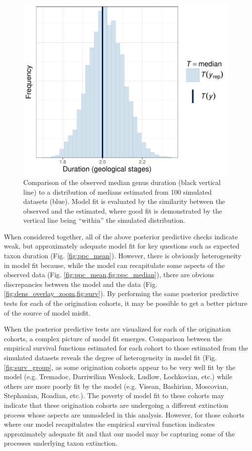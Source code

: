 \documentclass[11pt]{article}
\begin{document}
\begin{figure}[ht]
  \centering
  \includegraphics[height = 0.5\textheight,width=\textwidth,keepaspectratio=true]{figure/ppc_median_cweib_cens}
  \caption{ Comparison of the observed median genus duration (black vertical line) to a distribution of medians estimated from 100 simulated datasets (blue). Model fit is evaluated by the similarity between the observed and the estimated, where good fit is demonstrated by the vertical line being ``within'' the simulated distribution. }
  \label{fig:ppc_median}
\end{figure}


When considered together, all of the above posterior predictive checks indicate weak, but approximately adequate model fit for key questions such as expected taxon duration (Fig. \ref{fig:ppc_mean}). However, there is obviously heterogeneity in model fit because, while the model can recapitulate some aspects of the observed data (Fig. \ref{fig:ppc_mean,fig:ppc_median}), there are obvious discrepancies between the model and the data (Fig. \ref{fig:dens_overlay_zoom,fig:surv}). By performing the same posterior predictive tests for each of the origination cohorts, it may be possible to get a better picture of the source of model misfit.

When the posterior predictive tests are visualized for each of the origination cohorts, a complex picture of model fit emerges. Comparison between the empirical survival functions estimated for each cohort to those estimated from the simulated datasets reveals the degree of heterogeneity in model fit (Fig. \ref{fig:surv_group}, as some origination cohorts appear to be very well fit by the model (e.g. Tremadoc, Darriwilian Wenlock, Ludlow, Lochkovian, etc.) while others are more poorly fit by the model (e.g. Visean, Bashirian, Moscovian, Stephanian, Roadian, etc.). The poverty of model fit to these cohorts may indicate that these origination cohorts are undergoing a different extinction process whose aspects are unmodeled in this analysis. However, for those cohorts where our model recapitulates the empirical survival function indicates approximately adequate fit and that our model may be capturing some of the processes underlying taxon extinction.
\end{document}
